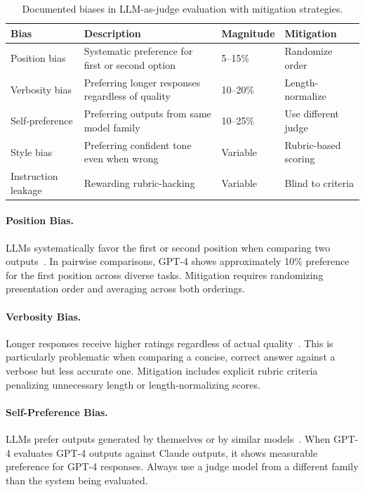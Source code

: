 \begin{table}[h]
\centering
\footnotesize
\caption{Documented biases in LLM-as-judge evaluation with mitigation strategies.}
\label{tab:llm-biases}
\begin{tabular}{@{}p{2.2cm}p{4.5cm}p{2cm}p{3cm}@{}}
\toprule
\textbf{Bias} & \textbf{Description} & \textbf{Magnitude} & \textbf{Mitigation} \\
\midrule
Position bias & Systematic preference for first or second option & 5--15\% & Randomize order \\
\addlinespace
Verbosity bias & Preferring longer responses regardless of quality & 10--20\% & Length-normalize \\
\addlinespace
Self-preference & Preferring outputs from same model family & 10--25\% & Use different judge \\
\addlinespace
Style bias & Preferring confident tone even when wrong & Variable & Rubric-based scoring \\
\addlinespace
Instruction leakage & Rewarding rubric-hacking & Variable & Blind to criteria \\
\bottomrule
\end{tabular}
\end{table}

\paragraph{Position Bias.} LLMs systematically favor the first or second position when comparing two outputs~\citep{wang2024large, zheng2023judging}. In pairwise comparisons, GPT-4 shows approximately 10\% preference for the first position across diverse tasks. Mitigation requires randomizing presentation order and averaging across both orderings.

\paragraph{Verbosity Bias.} Longer responses receive higher ratings regardless of actual quality~\citep{zheng2023judging}. This is particularly problematic when comparing a concise, correct answer against a verbose but less accurate one. Mitigation includes explicit rubric criteria penalizing unnecessary length or length-normalizing scores.

\paragraph{Self-Preference Bias.} LLMs prefer outputs generated by themselves or by similar models~\citep{panickssery2024llm}. When GPT-4 evaluates GPT-4 outputs against Claude outputs, it shows measurable preference for GPT-4 responses. Always use a judge model from a different family than the system being evaluated.

